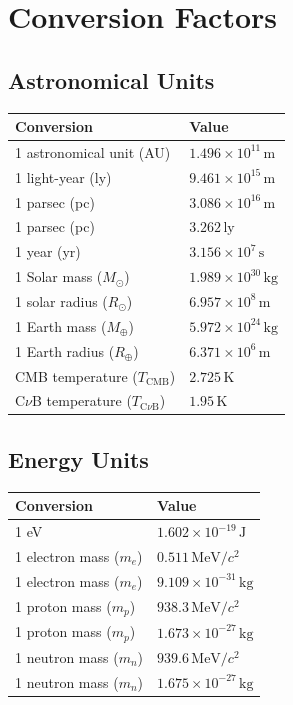 \section{Conversion Factors}
\subsection*{Astronomical Units}
\begin{center}
\begin{tabular}{ll}
\toprule
\textbf{Conversion} & \textbf{Value} \\
\midrule
1 astronomical unit (AU) & $1.496 \times 10^{11} \,\mathrm{m}$ \\
1 light-year (ly)   & $9.461\times10^{15}\,\mathrm{m}$ \\
1 parsec (pc)       & $3.086\times10^{16}\,\mathrm{m}$ \\
1 parsec (pc)       & $3.262\,\mathrm{ly}$ \\
1 year (yr)         & $3.156\times10^{7}\,\mathrm{s}$ \\
\midrule
1 Solar mass ($M_\odot$) & $1.989 \times 10^{30} \,\mathrm{kg}$ \\
1 solar radius ($R_\odot$) & $6.957 \times 10^8 \,\mathrm{m}$ \\
1 Earth mass ($M_\oplus$) & $5.972 \times 10^{24} \,\mathrm{kg}$ \\
1 Earth radius ($R_\oplus$) & $6.371 \times 10^6 \,\mathrm{m}$ \\
CMB temperature ($T_\text{CMB}$) & $2.725 \,\mathrm{K}$ \\
C$\nu$B temperature ($T_{\text{C}\nu\text{B}}$) & $1.95 \,\mathrm{K}$ \\
\bottomrule
\end{tabular}
\end{center}

\clearpage
\subsection*{Energy Units}
\begin{center}
\begin{tabular}{ll}
\toprule
\textbf{Conversion} & \textbf{Value} \\
\midrule
1 eV                & $1.602 \times 10^{-19} \,\mathrm{J}$ \\
1 electron mass ($m_e$) & $0.511 \,\mathrm{MeV}/c^2$ \\
1 electron mass ($m_e$) & $9.109 \times 10^{-31} \,\mathrm{kg}$ \\
1 proton mass ($m_p$) & $938.3 \,\mathrm{MeV}/c^2$ \\
1 proton mass ($m_p$) & $1.673 \times 10^{-27} \,\mathrm{kg}$ \\
1 neutron mass ($m_n$) & $939.6 \,\mathrm{MeV}/c^2$ \\
1 neutron mass ($m_n$) & $1.675 \times 10^{-27} \,\mathrm{kg}$ \\
\bottomrule
\end{tabular}
\end{center}


